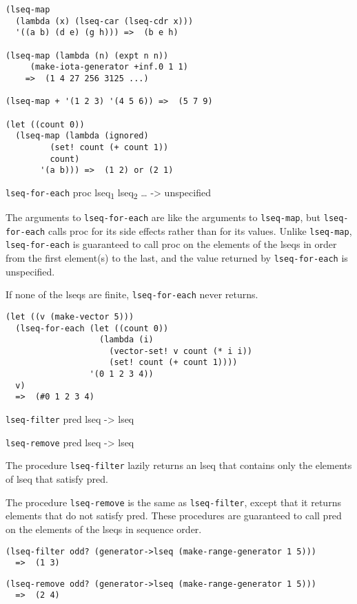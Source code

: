 \begin{verbatim}
(lseq-map
  (lambda (x) (lseq-car (lseq-cdr x)))
  '((a b) (d e) (g h))) =>  (b e h)

(lseq-map (lambda (n) (expt n n))
     (make-iota-generator +inf.0 1 1)
    =>  (1 4 27 256 3125 ...)

(lseq-map + '(1 2 3) '(4 5 6)) =>  (5 7 9)

(let ((count 0))
  (lseq-map (lambda (ignored)
         (set! count (+ count 1))
         count)
       '(a b))) =>  (1 2) or (2 1)
\end{verbatim}

\href{}{} \texttt{lseq-for-each} proc lseq\textsubscript{1}
lseq\textsubscript{2} \ldots{} -\textgreater{} unspecified

The arguments to \texttt{lseq-for-each} are like the arguments to
\texttt{lseq-map}, but \texttt{lseq-for-each} calls proc for its side
effects rather than for its values. Unlike \texttt{lseq-map},
\texttt{lseq-for-each} is guaranteed to call proc on the elements of the
lseqs in order from the first element(s) to the last, and the value
returned by \texttt{lseq-for-each} is unspecified.

If none of the lseqs are finite, \texttt{lseq-for-each} never returns.

\begin{verbatim}
(let ((v (make-vector 5)))
  (lseq-for-each (let ((count 0))
                   (lambda (i)
                     (vector-set! v count (* i i))
                     (set! count (+ count 1))))
                 '(0 1 2 3 4))
  v)
  =>  (#0 1 2 3 4)
\end{verbatim}

\href{}{} \texttt{lseq-filter} pred lseq -\textgreater{} lseq

\href{}{} \texttt{lseq-remove} pred lseq -\textgreater{} lseq

The procedure \texttt{lseq-filter} lazily returns an lseq that contains
only the elements of lseq that satisfy pred.

The procedure \texttt{lseq-remove} is the same as \texttt{lseq-filter},
except that it returns elements that do not satisfy pred. These
procedures are guaranteed to call pred on the elements of the lseqs in
sequence order.

\begin{verbatim}
(lseq-filter odd? (generator->lseq (make-range-generator 1 5)))
  =>  (1 3)
\end{verbatim}

\begin{verbatim}
(lseq-remove odd? (generator->lseq (make-range-generator 1 5)))
  =>  (2 4)
\end{verbatim}

